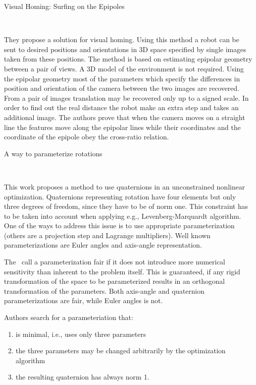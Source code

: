 \documentclass[10pt]{article}         %
\begin{document}
\begin{enumerate}
  {\Large \item Visual Homing: Surfing on the Epipoles}~\cite{basri1999visual}

  They propose a solution for visual homing.  Using this method a
  robot can be sent to desired positions and orientations in 3D space
  specified by single images taken from these positions.  The method
  is based on estimating epipolar geometry between a pair of views. A
  3D model of the environment is not required.  Using the epipolar
  geometry most of the parameters which specify the differences in
  position and orientation of the camera between the two images are
  recovered.  From a pair of images translation may be recovered only
  up to a signed scale.  In order to find out the real distance the
  robot make an extra step and takes an additional image.  The authors
  prove that when the camera moves on a straight line the features
  move along the epipolar lines while their coordinates and the
  coordinate of the epipole obey the cross-ratio relation.

  {\Large \item A way to parameterize rotations}~\cite{schmidt2001using}

  This work proposes a method to use quaternions in an unconstrained
  nonlinear optimization.  Quaternions representing rotation have four
  elements but only three degrees of freedom, since they have to be of
  norm one.  This constraint has to be taken into account when
  applying e.g., Levenberg-Marquardt algorithm.  One of the ways to
  address this issue is to use appropriate parameterization (others
  are a projection step and Lagrange multipliers). Well known
  parameterizations are Euler angles and axis-angle representation.

  The~\cite{hornegger1999representation} call a parameterization fair if
  it does not introduce more numerical sensitivity than inherent to
  the problem itself.  This is guaranteed, if any rigid transformation
  of the space to be parameterized results in an orthogonal
  transformation of the parameters.  Both axis-angle and quaternion
  parameterizations are fair, while Euler angles is not.

  Authors search for a parameteriation that:
  \begin{enumerate}
  \item is minimal, i.e., uses only three parameters
  \item the three parameters may be changed arbitrarily by the
    optimization algorithm
  \item the resulting quaternion has always norm 1.
  \end{enumerate}


\end{enumerate}
\end{document}
